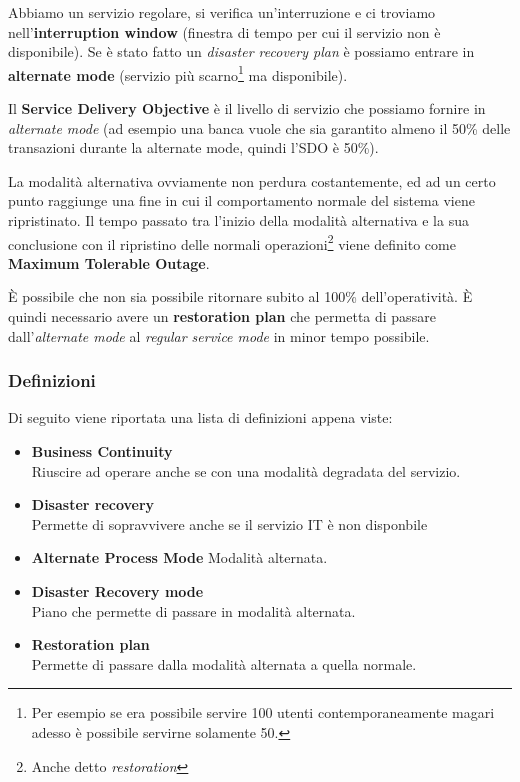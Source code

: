 Abbiamo un servizio regolare, si verifica un'interruzione e ci troviamo 
nell'\textbf{interruption window} (finestra di tempo per cui il servizio non è 
disponibile). Se \`e stato fatto un \textit{disaster recovery plan} \`e 
possiamo entrare in \textbf{alternate mode} (servizio più scarno\footnote{Per 
esempio se era possibile servire 100 utenti contemporaneamente magari adesso 
\`e possibile servirne solamente 50.} ma disponibile).

Il \textbf{Service Delivery Objective} \`e il livello di servizio che possiamo 
fornire in \textit{alternate mode} (ad esempio una banca vuole che sia garantito 
almeno il 50\% delle transazioni durante la alternate mode, quindi l'SDO è 
50\%).

La modalità alternativa ovviamente non perdura costantemente, ed ad un certo 
punto raggiunge una fine in cui il comportamento normale del sistema viene 
ripristinato. Il tempo passato tra l'inizio della modalità alternativa e la 
sua conclusione con il ripristino delle normali operazioni\footnote{Anche 
detto \textit{restoration}} viene definito come \textbf{Maximum Tolerable 
Outage}.

\`E possibile che non sia possibile ritornare subito al 100\% 
dell'operativit\`a. \`E quindi necessario avere un \textbf{restoration plan} 
che permetta di passare dall'\textit{alternate mode} al \textit{regular service 
mode} in minor tempo possibile.

\subsubsection{Definizioni}

Di seguito viene riportata una lista di definizioni appena viste:

\begin{itemize}
 \item \textbf{Business Continuity} \\
 Riuscire ad operare anche se con una modalità degradata del servizio.
 \item \textbf{Disaster recovery} \\
 Permette di sopravvivere anche se il servizio IT è non disponbile
 \item \textbf{Alternate Process Mode} 
 Modalità alternata.
 \item \textbf{Disaster Recovery mode} \\
 Piano che permette di passare in modalità alternata.
 \item \textbf{Restoration plan} \\
 Permette di passare dalla modalità alternata a quella normale.
\end{itemize}

